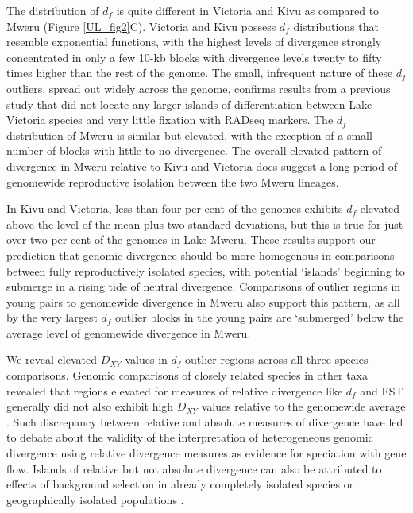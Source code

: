 The distribution of $d_f$ is quite different in Victoria and Kivu as compared to Mweru (Figure \ref{UL_fig2}C). Victoria and Kivu possess $d_f$ distributions that resemble exponential functions, with the highest levels of divergence strongly concentrated in only a few 10-kb blocks with divergence levels twenty to fifty times higher than the rest of the genome. The small, infrequent nature of these $d_f$ outliers, spread out widely across the genome, confirms results from a previous study \cite{brawand2014genomic} that did not locate any larger islands of differentiation between Lake Victoria species and very little fixation with RADseq markers. The $d_f$ distribution of Mweru is similar but elevated, with the exception of a small number of blocks with little to no divergence. The overall elevated pattern of divergence in Mweru relative to Kivu and Victoria does suggest a long period of genomewide reproductive isolation between the two Mweru lineages.

In Kivu and Victoria, less than four per cent of the genomes exhibits $d_f$ elevated above the level of the mean plus two standard deviations, but this is true for just over two per cent of the genomes in Lake Mweru. These results support our prediction that genomic divergence should be more homogenous in comparisons between fully reproductively isolated species, with potential `islands' beginning to submerge in a rising tide of neutral divergence. Comparisons of outlier regions in young pairs to genomewide divergence in Mweru also support this pattern, as all by the very largest $d_f$ outlier blocks in the young pairs are `submerged' below the average level of genomewide divergence in Mweru.

We reveal elevated $D_{XY}$ values in $d_f$ outlier regions across all three species comparisons. Genomic comparisons of closely related species in other taxa revealed that regions elevated for measures of relative divergence like $d_f$ and FST generally did not also exhibit high $D_{XY}$ values relative to the genomewide average \cite{cruickshank2014reanalysis}. Such discrepancy between relative and absolute measures of divergence have led to debate about the validity of the interpretation of heterogeneous genomic divergence using relative divergence measures as evidence for speciation with gene flow. Islands of relative but not absolute divergence can also be attributed to effects of background selection in already completely isolated species or geographically isolated populations \cite{cruickshank2014reanalysis}.


